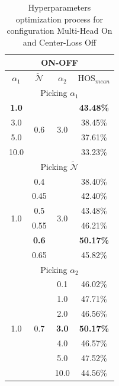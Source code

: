 \documentclass[10pt,twocolumn,letterpaper]{article}
\begin{document}
\begin{table}[h!]
  \vspace{-2cm}
  \centering
  \begin{tabular}[h]{||c|c|c||c||}
    \hline
    \multicolumn{4}{||c||}{ON-OFF} \\
    \hline
    $\alpha_1$ & $\mathcal{\tilde N}$ & $\alpha_2$ & HOS$_{mean}$\\    
    \hline
    \hline
    \multicolumn{4}{||c||}{Picking $\alpha_1$} \\
    \hline
    {\bf 1.0}  & \multirow{4}{*}{0.6} & \multirow{4}{*}{3.0} & {\bf 43.48\%} \\
    3.0  & & & 38.45\% \\
    5.0  & & & 37.61\% \\
    10.0 & & & 33.23\% \\
    \hline
    \hline
    \multicolumn{4}{||c||}{Picking $\mathcal{\tilde N}$} \\
    \hline
    \multirow{6}{*}{1.0} & 0.4 & \multirow{6}{*}{3.0}  & 38.40\%\\
    & 0.45 & & 42.40\% \\
    & 0.5 & & 43.48\% \\
    & 0.55 & & 46.21\% \\
    & {\bf0.6} & & {\bf 50.17\%} \\
    & 0.65 & & 45.82\% \\
    \hline
    \hline
    \multicolumn{4}{||c||}{Picking $\alpha_2$} \\
    \hline
    \multirow{7}{*}{1.0} & \multirow{7}{*}{0.7} & 0.1 & 46.02\%\\
    && 1.0 & 47.71\% \\
    && 2.0 & 46.56\% \\
    && {\bf 3.0} & {\bf 50.17\%} \\
    && 4.0 & 46.57\% \\
    && 5.0 & 47.52\% \\
    && 10.0 & 44.56\% \\
    \hline
  \end{tabular}
  \caption{\centering\label{tab:ablationonoff} Hyperparameters optimization process for configuration Multi-Head On and Center-Loss Off}
\end{table}
\end{document}
